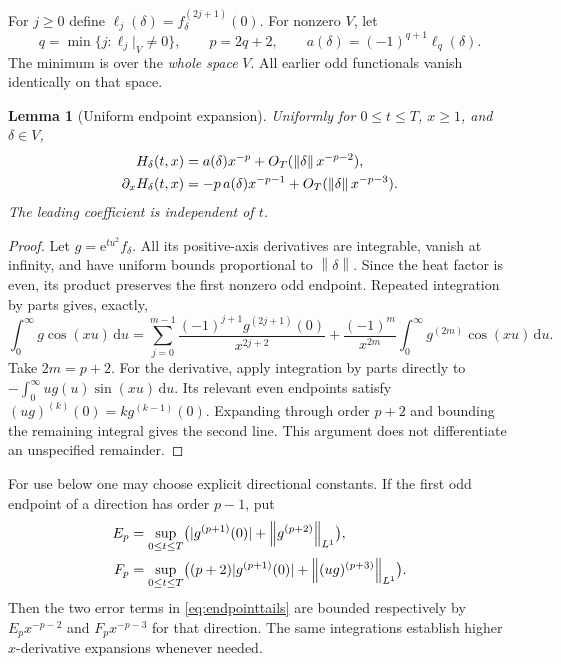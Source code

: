 \documentclass[11pt]{article}
\newtheorem{lemma}[theorem]{Lemma}
\theoremstyle{remark}\newtheorem{remark}[theorem]{Remark}
\newcommand{\norm}[1]{\left\lVert #1\right\rVert}
\newcommand{\dd}{\,\mathrm d}
\newcommand{\e}{\mathrm e}
\begin{document}
For $j\ge0$ define $\ell_j(\delta)=f_\delta^{(2j+1)}(0)$. For nonzero $V$, let
\begin{equation}\label{eq:p}
 q=\min\{j:\ell_j|_V\ne0\},\qquad p=2q+2,\qquad
 a(\delta)=(-1)^{q+1}\ell_q(\delta).
\end{equation}
The minimum is over the \emph{whole space} $V$. All earlier odd functionals vanish identically on that space.

\begin{lemma}[Uniform endpoint expansion]\label{lem:tails}
Uniformly for $0\le t\le T$, $x\ge1$, and $\delta\in V$,
\begin{align}\label{eq:endpointtails}
 H_\delta(t,x)&=a(\delta)x^{-p}+O_T(\norm\delta x^{-p-2}),\notag\\
 \partial_xH_\delta(t,x)&=-p\,a(\delta)x^{-p-1}+O_T(\norm\delta x^{-p-3}).
\end{align}
The leading coefficient is independent of $t$.
\end{lemma}
\begin{proof}
Let $g=\e^{tu^2}f_\delta$. All its positive-axis derivatives are integrable, vanish at infinity, and have uniform bounds proportional to $\norm\delta$. Since the heat factor is even, its product preserves the first nonzero odd endpoint. Repeated integration by parts gives, exactly,
\begin{equation}\label{eq:ibp}
 \int_0^\infty g\cos(xu)\dd u
 =\sum_{j=0}^{m-1}\frac{(-1)^{j+1}g^{(2j+1)}(0)}{x^{2j+2}}
 +\frac{(-1)^m}{x^{2m}}\int_0^\infty g^{(2m)}\cos(xu)\dd u.
\end{equation}
Take $2m=p+2$. For the derivative, apply integration by parts directly to $-\int_0^\infty ug(u)\sin(xu)\dd u$. Its relevant even endpoints satisfy $(ug)^{(k)}(0)=k g^{(k-1)}(0)$. Expanding through order $p+2$ and bounding the remaining integral gives the second line. This argument does not differentiate an unspecified remainder.
\end{proof}

For use below one may choose explicit directional constants. If the first odd endpoint of a direction has order $p-1$, put
\begin{align}\label{eq:EF}
 E_p&=\sup_{0\le t\le T}\bigl(|g^{(p+1)}(0)|+\norm{g^{(p+2)}}_{L^1}\bigr),\notag\\
 F_p&=\sup_{0\le t\le T}\bigl((p+2)|g^{(p+1)}(0)|+\norm{(ug)^{(p+3)}}_{L^1}\bigr).
\end{align}
Then the two error terms in \eqref{eq:endpointtails} are bounded respectively by $E_p x^{-p-2}$ and $F_p x^{-p-3}$ for that direction. The same integrations establish higher $x$-derivative expansions whenever needed.
\end{document}
